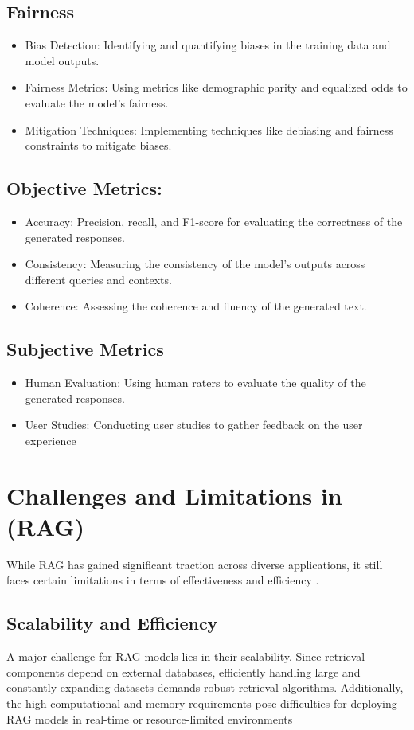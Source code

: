 \subsection{Fairness}
\begin{itemize}
	
	\item Bias Detection: Identifying and quantifying biases in the training data and model outputs.
	\item Fairness Metrics: Using metrics like demographic parity and equalized odds to evaluate the model's fairness.
	\item Mitigation Techniques: Implementing techniques like debiasing and fairness constraints to mitigate biases.
\end{itemize}
\subsection{Objective Metrics:}
\begin{itemize}
	\item Accuracy: Precision, recall, and F1-score for evaluating the correctness of the generated responses.
	\item Consistency: Measuring the consistency of the model's outputs across different queries and contexts.
	\item Coherence: Assessing the coherence and fluency of the generated text.
\end{itemize}
\subsection{Subjective Metrics}
\begin{itemize}
	\item Human Evaluation: Using human raters to evaluate the quality of the generated responses.
	\item User Studies: Conducting user studies to gather feedback on the user experience
\end{itemize}
\section{ Challenges and Limitations in (RAG)}
While RAG has gained significant traction across diverse applications, it still faces certain limitations in terms of effectiveness and efficiency\cite{zhao2024retrieval} \cite{gupta2024comprehensive}.
\subsection{Scalability and Efficiency}
A major challenge for RAG models lies in their scalability. Since retrieval components depend on external databases, efficiently handling large and constantly expanding datasets demands robust retrieval algorithms. Additionally, the high computational and memory requirements pose difficulties for deploying RAG models in real-time or resource-limited environments
